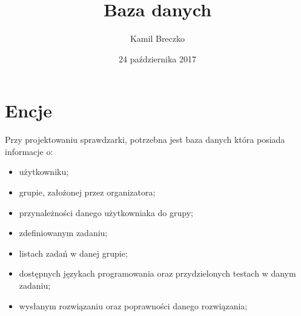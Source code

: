\documentclass[a4paper]{mwart}
\author{Kamil Breczko}
\title{Baza danych}
\date{24 października 2017}
\begin{document}
\maketitle
\thispagestyle{empty}

\newpage

\tableofcontents
\thispagestyle{empty}

\newpage
\section{Encje}
 Przy projektowaniu sprawdzarki, potrzebna jest baza danych która posiada informacje o: 
 \begin{itemize}
	\item użytkowniku;
	\item grupie, założonej przez organizatora;
	\item przynależności danego użytkowniaka do grupy;
	\item zdefiniowanym zadaniu; 
	\item listach zadań w danej grupie; 
	\item dostępnych językach programowania oraz przydzielonych testach w danym zadaniu;
	\item wysłanym rozwiązaniu oraz poprawności danego rozwiązania;
\end{itemize}
\end{document}
